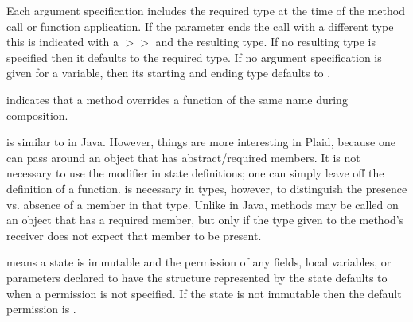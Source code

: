 Each argument specification includes the required type at the time of
the method call or function application.  If the parameter ends the
call with a different type this is indicated with a $>>$ and the
resulting type. If no resulting type is specified then it defaults to
the required type.  If no argument specification is given for
a variable, then its starting and ending type defaults to .


\begin{quote}



 {}

 {}


 {}


 {}

 {}

\end{quote}


 indicates that a method overrides a function of the
same name during composition.

 is similar to  in Java.  However,
things are more interesting in Plaid, because one can pass around an
object that has abstract/required members.  It is not necessary to
use the  modifier in state definitions; one can simply
leave off the definition of a function.   is necessary
in types, however, to distinguish the presence vs. absence of a
member in that type.  Unlike in Java, methods may be called on an
object that has a required member, but only if the type given to the
method's receiver does not expect that member to be present.

 means a state is immutable and the permission of any fields,
local variables, or parameters declared to have the structure represented
by the state defaults to  when a permission
is not specified.  If the state is not immutable
then the default permission is .


